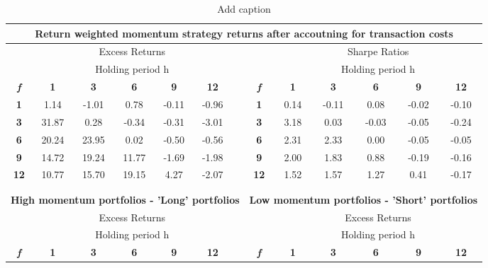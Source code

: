 \documentclass{article}
\begin{document}
\begin{table}[htbp]
  \centering
  \caption{Add caption}
    \begin{tabular}{ccccccrcccccc}
    \multicolumn{13}{c}{Return weighted momentum strategy returns after accoutning for transaction costs} \\
    \midrule
          & \multicolumn{5}{c}{Excess Returns}    &       &       & \multicolumn{5}{c}{Sharpe Ratios} \\
\cmidrule{2-6}\cmidrule{9-13}          & \multicolumn{5}{c}{Holding period h}  &       &       & \multicolumn{5}{c}{Holding period h} \\
    \textit{\textbf{f}} & \textbf{1} & \textbf{3} & \textbf{6} & \textbf{9} & \textbf{12} &       & \textit{\textbf{f}} & \textbf{1} & \textbf{3} & \textbf{6} & \textbf{9} & \textbf{12} \\
\cmidrule{2-6}\cmidrule{9-13}    \textbf{1} & 1.14  & -1.01 & 0.78  & -0.11 & -0.96 &       & \textbf{1} & 0.14  & -0.11 & 0.08  & -0.02 & -0.10 \\
    \textbf{3} & 31.87 & 0.28  & -0.34 & -0.31 & -3.01 &       & \textbf{3} & 3.18  & 0.03  & -0.03 & -0.05 & -0.24 \\
    \textbf{6} & 20.24 & 23.95 & 0.02  & -0.50 & -0.56 &       & \textbf{6} & 2.31  & 2.33  & 0.00  & -0.05 & -0.05 \\
    \textbf{9} & 14.72 & 19.24 & 11.77 & -1.69 & -1.98 &       & \textbf{9} & 2.00  & 1.83  & 0.88  & -0.19 & -0.16 \\
    \textbf{12} & 10.77 & 15.70 & 19.15 & 4.27  & -2.07 &       & \textbf{12} & 1.52  & 1.57  & 1.27  & 0.41  & -0.17 \\
    \midrule
          &       &       &       &       &       &       &       &       &       &       &       &  \\
          &       &       &       &       &       &       &       &       &       &       &       &  \\
    \multicolumn{7}{c}{\textbf{High momentum portfolios - 'Long' portfolios}} & \multicolumn{6}{c}{\textbf{Low momentum portfolios - 'Short' portfolios}} \\
    \midrule
          & \multicolumn{5}{c}{Excess Returns}    &       &       & \multicolumn{5}{c}{Excess Returns} \\
\cmidrule{2-6}\cmidrule{9-13}          & \multicolumn{5}{c}{Holding period h}  &       &       & \multicolumn{5}{c}{Holding period h} \\
    \textit{\textbf{f}} & \textbf{1} & \textbf{3} & \textbf{6} & \textbf{9} & \textbf{12} &       & \textit{\textbf{f}} & \textbf{1} & \textbf{3} & \textbf{6} & \textbf{9} & \textbf{12} \\

\end{tabular}
\end{table}
\end{document}
